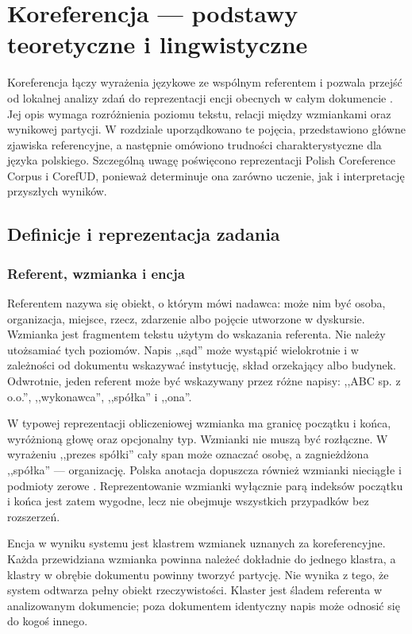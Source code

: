 \chapter{Koreferencja --- podstawy teoretyczne i lingwistyczne}
\label{chap:koreferencja}

Koreferencja łączy wyrażenia językowe ze wspólnym referentem i pozwala przejść od lokalnej analizy zdań do reprezentacji encji obecnych w całym dokumencie \cite{jurafsky_2025_speech}. Jej opis wymaga rozróżnienia poziomu tekstu, relacji między wzmiankami oraz wynikowej partycji. W rozdziale uporządkowano te pojęcia, przedstawiono główne zjawiska referencyjne, a następnie omówiono trudności charakterystyczne dla języka polskiego. Szczególną uwagę poświęcono reprezentacji Polish Coreference Corpus i CorefUD, ponieważ determinuje ona zarówno uczenie, jak i interpretację przyszłych wyników.

\section{Definicje i reprezentacja zadania}
\label{sec:definicje-coref}

\subsection{Referent, wzmianka i encja}

Referentem nazywa się obiekt, o którym mówi nadawca: może nim być osoba, organizacja, miejsce, rzecz, zdarzenie albo pojęcie utworzone w dyskursie. Wzmianka jest fragmentem tekstu użytym do wskazania referenta. Nie należy utożsamiać tych poziomów. Napis ,,sąd'' może wystąpić wielokrotnie i w zależności od dokumentu wskazywać instytucję, skład orzekający albo budynek. Odwrotnie, jeden referent może być wskazywany przez różne napisy: ,,ABC sp. z o.o.'', ,,wykonawca'', ,,spółka'' i ,,ona''.

W typowej reprezentacji obliczeniowej wzmianka ma granicę początku i końca, wyróżnioną głowę oraz opcjonalny typ. Wzmianki nie muszą być rozłączne. W wyrażeniu ,,prezes spółki'' cały span może oznaczać osobę, a zagnieżdżona ,,spółka'' --- organizację. Polska anotacja dopuszcza również wzmianki nieciągłe i podmioty zerowe \cite{ogrodniczuk_2014_pcc,ogrodniczuk_2019_referencyjne}. Reprezentowanie wzmianki wyłącznie parą indeksów początku i końca jest zatem wygodne, lecz nie obejmuje wszystkich przypadków bez rozszerzeń.

Encja w wyniku systemu jest klastrem wzmianek uznanych za koreferencyjne. Każda przewidziana wzmianka powinna należeć dokładnie do jednego klastra, a klastry w obrębie dokumentu powinny tworzyć partycję. Nie wynika z tego, że system odtwarza pełny obiekt rzeczywistości. Klaster jest śladem referenta w analizowanym dokumencie; poza dokumentem identyczny napis może odnosić się do kogoś innego.

